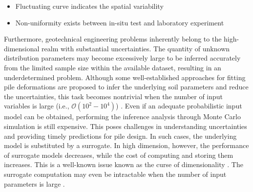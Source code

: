 \setlength{\parskip}{0pt}

\begin{itemize}

    \item Fluctuating curve indicates the spatial  variability
    \item Non-uniformity exists between in-situ test and laboratory experiment

\end{itemize}
\vspace{0.2cm}

Furthermore, geotechnical engineering problems inherently belong to the high-dimensional realm with substantial uncertainties. The quantity of unknown distribution parameters may become excessively large to be inferred accurately from the limited sample size within the available dataset, resulting in an underdetermined problem. Although some well-established approaches for fitting pile deformations are proposed to infer the underlying soil parameters and  reduce the uncertainties, this task becomes nontrivial when the number of input variables is large (i.e., $\mathcal{O}(10^2-10^4)$) \citep{lataniotis2019}. 
Even if an adequate probabilistic input model can be obtained, performing the inference analysis  through Monte Carlo simulation is still expensive. This poses challenges in understanding uncertainties and providing timely predictions for pile design.
 In such cases, the underlying model is substituted by a surrogate. In high dimension, however,
the performance of surrogate models decreases, while the cost of computing and storing them increases. This is a well-known issue known as the curse
of dimensionality \citep{verleysen2005}. The surrogate computation
may even be intractable when the number of input parameters is large \citep{lataniotis2019}.



